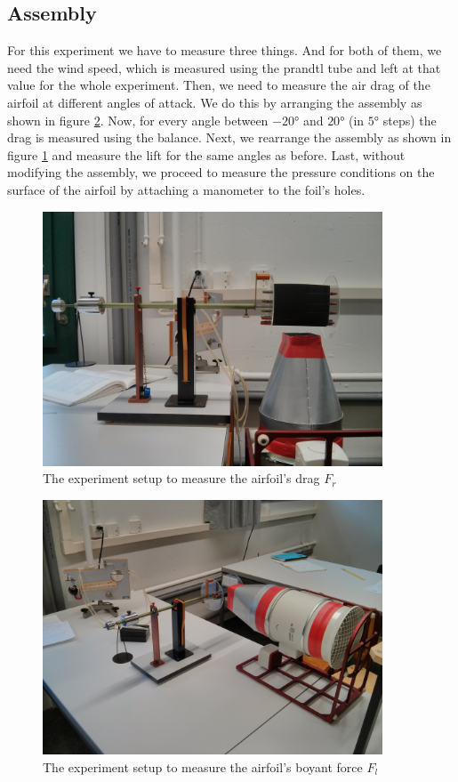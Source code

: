 \documentclass{scrreprt}
\begin{document}
\subsection{Assembly}
For this experiment we have to measure three things. And for both of them, we need the wind speed, which is measured using the prandtl tube and left at that value for the whole experiment. Then, we need to measure the air drag of the airfoil at different angles of attack. We do this by arranging the assembly as shown in figure \ref{fig:assembly1}. Now, for every angle between $\ang{-20}$ and $\ang{+20}$ (in $\ang{5}$ steps) the drag is measured using the balance.
Next, we rearrange the assembly as shown in figure \ref{fig:assembly2} and measure the lift for the same angles as before. Last, without modifying the assembly, we proceed to measure the pressure conditions on the surface of the airfoil by attaching a manometer to the foil's holes.

\begin{figure}[H]
	\centering
  \includegraphics[width=0.9\textwidth]{img/assembly2.jpg}
	\caption{The experiment setup to measure the airfoil's drag $F_r$}
	\label{fig:assembly2}
\end{figure}

\begin{figure}[H]
	\centering
  \includegraphics[width=0.9\textwidth]{img/assembly1.jpg}
	\caption{The experiment setup to measure the airfoil's boyant force $F_l$}
	\label{fig:assembly1}
\end{figure}
\end{document}
